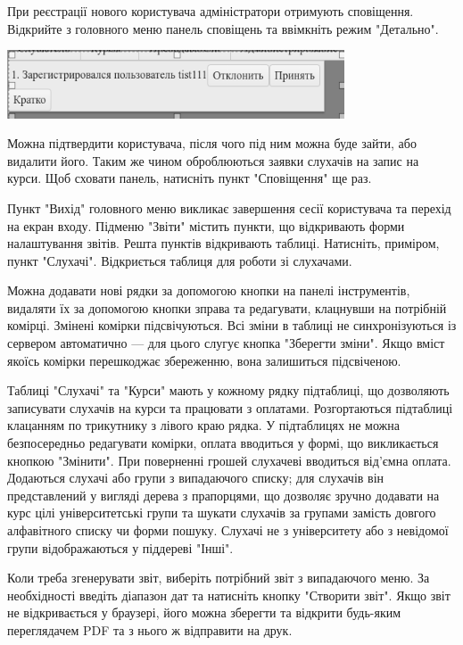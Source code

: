 При реєстрації нового користувача адміністратори отримують сповіщення. Відкрийте з головного меню панель сповіщень та ввімкніть режим "Детально".
\begin{center}\includegraphics[width=10cm]{scrns/notifications.png}\end{center}

Можна підтвердити користувача, після чого під ним можна буде зайти, або видалити його. Таким же чином оброблюються заявки слухачів на запис на курси. Щоб сховати панель, натисніть пункт "Сповіщення" ще раз.

Пункт "Вихід" головного меню викликає завершення сесії користувача та перехід на екран входу. Підменю "Звіти" містить пункти, що відкривають форми налаштування звітів. Решта пунктів відкривають таблиці. Натисніть, приміром, пункт "Слухачі". Відкриється таблиця для роботи зі слухачами.

Можна додавати нові рядки за допомогою кнопки на панелі інструментів, видаляти їх за допомогою кнопки зправа та редагувати, клацнувши на потрібній комірці. Змінені комірки підсвічуються. Всі зміни в таблиці не синхронізуються із сервером автоматично --- для цього слугує кнопка "Зберегти зміни". Якщо вміст якоїсь комірки перешкоджає збереженню, вона залишиться підсвіченою.

Таблиці "Слухачі" та "Курси" мають у кожному рядку підтаблиці, що дозволяють записувати слухачів на курси та працювати з оплатами. Розгортаються підтаблиці клацанням по трикутнику з лівого краю рядка. У підтаблицях не можна безпосередньо редагувати комірки, оплата вводиться у формі, що викликається кнопкою "Змінити". При поверненні грошей слухачеві вводиться від'ємна оплата. Додаються слухачі або групи з випадаючого списку; для слухачів він представлений у вигляді дерева з прапорцями, що дозволяє зручно додавати на курс цілі університетські групи та шукати слухачів за групами замість довгого алфавітного списку чи форми пошуку. Слухачі не з університету або з невідомої групи відображаються у піддереві "Інші".

Коли треба згенерувати звіт, виберіть потрібний звіт з випадаючого меню. За необхідності введіть діапазон дат та натисніть кнопку "Створити звіт". Якщо звіт не відкривається у браузері, його можна зберегти та відкрити будь-яким переглядачем PDF та з нього ж відправити на друк.
